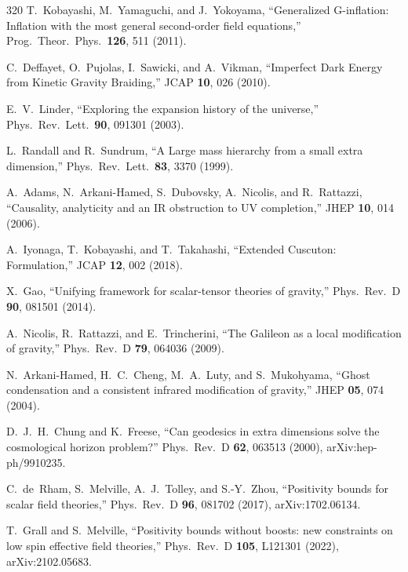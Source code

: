 \begin{thebibliography}{320}
T.~Kobayashi, M.~Yamaguchi, and J.~Yokoyama,
``Generalized G-inflation: Inflation with the most general second-order field equations,''
Prog.\ Theor.\ Phys.\ \textbf{126}, 511 (2011).

C.~Deffayet, O.~Pujolas, I.~Sawicki, and A.~Vikman,
``Imperfect Dark Energy from Kinetic Gravity Braiding,''
JCAP \textbf{10}, 026 (2010).

E.~V.~Linder,
``Exploring the expansion history of the universe,''
Phys.\ Rev.\ Lett.\ \textbf{90}, 091301 (2003).

L.~Randall and R.~Sundrum,
``A Large mass hierarchy from a small extra dimension,''
Phys.\ Rev.\ Lett.\ \textbf{83}, 3370 (1999).

A.~Adams, N.~Arkani-Hamed, S.~Dubovsky, A.~Nicolis, and R.~Rattazzi,
``Causality, analyticity and an IR obstruction to UV completion,''
JHEP \textbf{10}, 014 (2006).

A.~Iyonaga, T.~Kobayashi, and T.~Takahashi,
``Extended Cuscuton: Formulation,''
JCAP \textbf{12}, 002 (2018).

X.~Gao,
``Unifying framework for scalar-tensor theories of gravity,''
Phys.\ Rev.\ D \textbf{90}, 081501 (2014).

A.~Nicolis, R.~Rattazzi, and E.~Trincherini,
``The Galileon as a local modification of gravity,''
Phys.\ Rev.\ D \textbf{79}, 064036 (2009).

N.~Arkani-Hamed, H.~C.~Cheng, M.~A.~Luty, and S.~Mukohyama,
``Ghost condensation and a consistent infrared modification of gravity,''
JHEP \textbf{05}, 074 (2004).

D.~J.~H.~Chung and K.~Freese,
``Can geodesics in extra dimensions solve the cosmological horizon problem?''
Phys.\ Rev.\ D \textbf{62}, 063513 (2000),
arXiv:hep-ph/9910235.

C.~de~Rham, S.~Melville, A.~J.~Tolley, and S.-Y.~Zhou,
``Positivity bounds for scalar field theories,''
Phys.\ Rev.\ D \textbf{96}, 081702 (2017),
arXiv:1702.06134.

T.~Grall and S.~Melville,
``Positivity bounds without boosts: new constraints on low spin effective field theories,''
Phys.\ Rev.\ D \textbf{105}, L121301 (2022),
arXiv:2102.05683.


\end{thebibliography}
